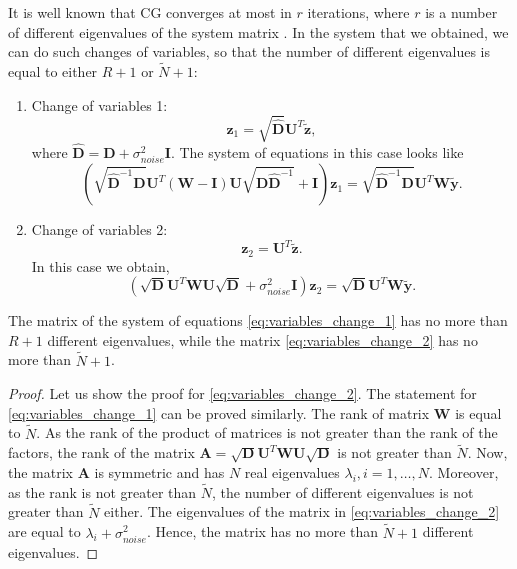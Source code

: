 It is well known that CG converges at most in $r$ iterations, where
$r$ is a number of different eigenvalues of the system matrix \cite{nocedal2006numerical}.
In the system that we obtained, we can do such changes of variables,
so that the number of different eigenvalues is equal to either $R + 1$ or $\widetilde{N} + 1$:
\begin{enumerate}
\item Change of variables 1:
\[
\mathbf{z}_1 = \sqrt{\mathbf{\widehat{D}}} \mathbf{U}^T \mathbf{\widetilde{z}},
\]
where $\mathbf{\widehat{D}} = \mathbf{D} + \sigma^2_{noise}\mathbf{I}$.
The system of equations in this case looks like
\begin{equation}
\label{eq:variables_change_1}
        \left ( \sqrt{\mathbf{\widehat{D}}^{-1} \mathbf{D}} \mathbf{U}^T (\mathbf{W - I})
            \mathbf{U}\sqrt{\mathbf{D \widehat{D}}^{-1}} + \mathbf{I}
        \right ) \mathbf{z}_1 = \sqrt{\mathbf{\widehat{D}}^{-1} \mathbf{D}} \mathbf{U}^T \mathbf{W \widetilde{y}}.
\end{equation}
\item Change of variables 2:
\[
\mathbf{z}_2 = \mathbf{U}^T \mathbf{\widetilde{z}}.
\]
In this case we obtain,
\begin{equation}
\label{eq:variables_change_2}
        \left ( \sqrt{\mathbf{D}} \mathbf{U}^T \mathbf{W}
            \mathbf{U}\sqrt{\mathbf{D}} + \sigma^2_{noise}\mathbf{I}
        \right ) \mathbf{z}_2 = \sqrt{\mathbf{D}} \mathbf{U}^T \mathbf{W \widetilde{y}}.
\end{equation}
\end{enumerate}

\begin{proposition}
The matrix of the system of equations \eqref{eq:variables_change_1} has no more than $R + 1$
different eigenvalues,
while the matrix \eqref{eq:variables_change_2} has no more than $\widetilde{N} + 1$.
\end{proposition}
\begin{proof}
    Let us show the proof for \eqref{eq:variables_change_2}.
    The statement for \eqref{eq:variables_change_1} can be proved similarly.
    The rank of matrix $\mathbf{W}$ is equal to $\widetilde{N}$.
    As the rank of the product of matrices is not greater than the rank of the factors,
    the rank of the matrix
    $\mathbf{A} = \sqrt{\mathbf{D}} \mathbf{U}^T \mathbf{W} \mathbf{U}\sqrt{\mathbf{D}}$
    is not greater than $\widetilde{N}$.
    Now, the matrix $\mathbf{A}$ is symmetric and has $N$ real eigenvalues
    $\lambda_i, i = 1, \ldots, N$.
    Moreover, as the rank is not greater than $\widetilde{N}$, the number of different eigenvalues
    is not greater than $\widetilde{N}$ either.
    The eigenvalues of the matrix in \eqref{eq:variables_change_2}
    are equal to $\lambda_i + \sigma^2_{noise}$.
    Hence, the matrix has no more than $\widetilde{N} + 1$ different eigenvalues.
\end{proof}


